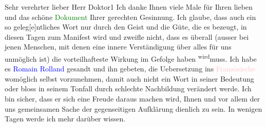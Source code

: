 \pstart\center{}Sehr verehrter lieber Herr Doktor1\pend\vspace{0.5em}
\pstart
           Ich danke Ihnen viele Mal\introOben{}e\introOben{} für Ihren lieben \label{K_L03683-1v}\label{K_L03683-1} und das schöne \textcolor{green}{Dokument}\ledrightnote{{$\rightarrow$}\emph{\textcolor{green}{Une protestation d’Arthur Schnitzler}}} Ihrer gerechten
               Gesinnung. Ich glaube, dass auch ein so geleg{[}e{]}ntliches Wort nur
               durch den Geist und die Güte, die es bezeugt, in diesen Tagen zum Manifest wird und
               zweifle nicht, dass es überall (ausser bei jenen Menschen, mit denen eine innere
               Verständigung über alles für uns unmöglich ist) die vorteilhafteste Wirkung im
               Gefolge haben \substVorne{}\textsuperscript{wird}\substDazwischen{}muss\substHinten{}. Ich habe es \textcolor{blue}{Romain Rolland}\ledrightnote{\textcolor{blue}{Romain Rolland}} gesandt
               und ihn gebeten, die Uebersetzung ins \textcolor{pink}{Französische}\ledrightnote{\textcolor{pink}{Frankreich}} womöglich selbst vorzunehmen, damit auch nicht ein Wort in
               seiner Bedeutung oder bloss \introOben{}in\introOben{} seinem Tonfall durch
               schlechte Nachbildung verändert werde. Ich bin sicher, dass er sich eine Freude
               daraus machen wird\introOben{},\introOben{} Ihnen und vor allem der uns gemeinsamen
               Sache der gegenseitigen Aufklärung dienlich zu sein. In wenigen Tagen werde ich mehr
               darüber wissen.\pend
           
